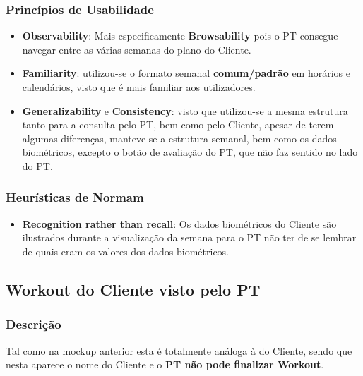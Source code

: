 \subsubsection{Princípios de Usabilidade}
\begin{itemize}
    \item \textbf{Observability}: Mais especificamente \textbf{Browsability} pois o PT consegue navegar entre as várias semanas do plano do Cliente.
    
    \item \textbf{Familiarity}: utilizou-se o formato semanal \textbf{comum/padrão} em horários e calendários, visto que é mais familiar aos utilizadores.
    
    \item \textbf{Generalizability} e \textbf{Consistency}: visto que utilizou-se a mesma estrutura tanto para a consulta pelo PT, bem como pelo Cliente, apesar de terem algumas diferenças, manteve-se a estrutura semanal, bem como os dados biométricos, excepto o botão de avaliação do PT, que não faz sentido no lado do PT.
\end{itemize}

\subsubsection{Heurísticas de Normam}
\begin{itemize}
    \item \textbf{Recognition rather than recall}: Os dados biométricos do Cliente são ilustrados durante a visualização da semana para o PT não ter de se lembrar de quais eram os valores dos dados biométricos.
\end{itemize}

\subsection{Workout do Cliente visto pelo PT}
\label{subsec:workoutcliente}

\subsubsection{Descrição}
\hspace{5mm} Tal como na mockup anterior esta é totalmente análoga à do Cliente, sendo que nesta aparece o nome do Cliente e o \textbf{PT não pode finalizar Workout}.

